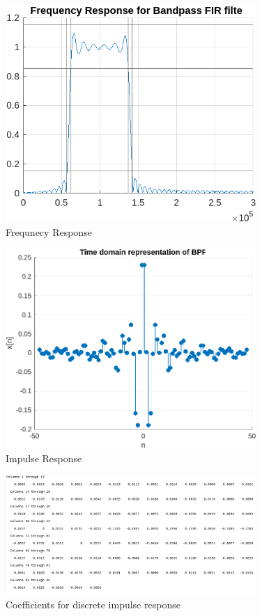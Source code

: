 \documentclass{scrartcl}
\begin{document}
\begin{figure}[ht!]
    \centering
    \includegraphics[width = 0.85\textwidth]{Graphics/BandpassFIR.png}
    \caption{Frequnecy Response}
\end{figure}

\begin{figure}[ht!]
    \centering
    \includegraphics[width = 0.85\textwidth]{Graphics/impulsepass.png}
    \caption{Impulse Response}
\end{figure}

\begin{figure}[ht!]
    \centering
    \includegraphics[width = 0.85\textwidth]{Graphics/BandpassCol.png}
    \caption{Coefficients for discrete impulse response}
\end{figure}
\end{document}
